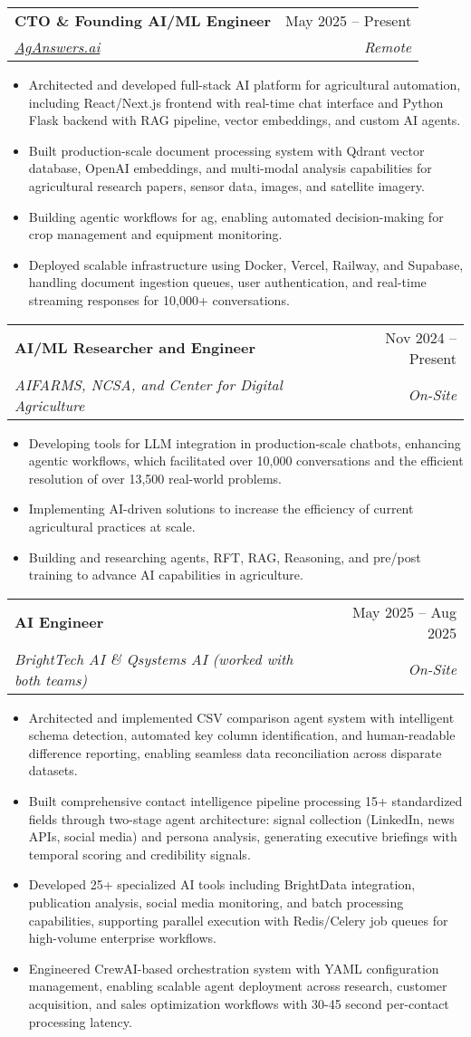 \documentclass[letterpaper,10.99999999999999pt]{article}
\makeatletter
\newcommand{\resumeItem}[1]{
  \item\small{
    {#1 \vspace{-1pt}}
  }
}
\newcommand{\resumeSubheading}[4]{
  \vspace{-1pt}\item
    \begin{tabular*}{0.97\textwidth}[t]{l@{\extracolsep{\fill}}r}
      \textbf{#1} & #2 \\
      \textit{\small#3} & \textit{\small #4} \\
    \end{tabular*}\vspace{-6pt}
}
\newcommand{\resumeItemListStart}{\begin{itemize}}
\newcommand{\resumeItemListEnd}{\end{itemize}\vspace{-5pt}}
\makeatother
\begin{document}
  \resumeSubheading
      {CTO \& Founding AI/ML Engineer}{May 2025 – Present}
      {\href{https://aganswers.ai/}{AgAnswers.ai}}{Remote}
      \resumeItemListStart
        \resumeItem{Architected and developed full-stack AI platform for agricultural automation, including React/Next.js frontend with real-time chat interface and Python Flask backend with RAG pipeline, vector embeddings, and custom AI agents.}
        \resumeItem{Built production-scale document processing system with Qdrant vector database, OpenAI embeddings, and multi-modal analysis capabilities for agricultural research papers, sensor data, images, and satellite imagery.}
        \resumeItem{Building agentic workflows for ag, enabling automated decision-making for crop management and equipment monitoring.}
        \resumeItem{Deployed scalable infrastructure using Docker, Vercel, Railway, and Supabase, handling document ingestion queues, user authentication, and real-time streaming responses for 10,000+ conversations.}
      \resumeItemListEnd

  \resumeSubheading
      {AI/ML Researcher and Engineer}{Nov 2024 – Present}
      {AIFARMS, NCSA, and Center for Digital Agriculture}{On-Site}
      \resumeItemListStart
        \resumeItem{Developing tools for LLM integration in production-scale chatbots, enhancing agentic workflows, which facilitated over 10,000 conversations and the efficient resolution of over 13,500 real-world problems.}
        \resumeItem{Implementing AI-driven solutions to increase the efficiency of current agricultural practices at scale.}
        \resumeItem{Building and researching agents, RFT, RAG, Reasoning, and pre/post training to advance AI capabilities in agriculture.}
      \resumeItemListEnd

    \resumeSubheading
      {AI Engineer}{May 2025 – Aug 2025}
      {BrightTech AI \& Qsystems AI (worked with both teams)}{On-Site}
      \resumeItemListStart
        \resumeItem{Architected and implemented CSV comparison agent system with intelligent schema detection, automated key column identification, and human-readable difference reporting, enabling seamless data reconciliation across disparate datasets.}
        \resumeItem{Built comprehensive contact intelligence pipeline processing 15+ standardized fields through two-stage agent architecture: signal collection (LinkedIn, news APIs, social media) and persona analysis, generating executive briefings with temporal scoring and credibility signals.}
        \resumeItem{Developed 25+ specialized AI tools including BrightData integration, publication analysis, social media monitoring, and batch processing capabilities, supporting parallel execution with Redis/Celery job queues for high-volume enterprise workflows.}
        \resumeItem{Engineered CrewAI-based orchestration system with YAML configuration management, enabling scalable agent deployment across research, customer acquisition, and sales optimization workflows with 30-45 second per-contact processing latency.}
      \resumeItemListEnd
\end{document}
